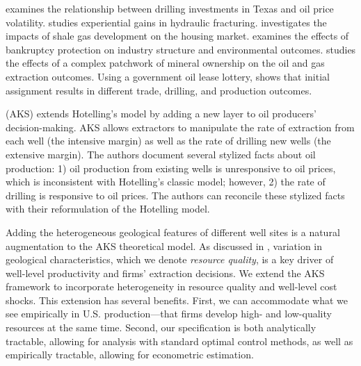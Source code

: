 {\cite{The-Effect-of-Uncertainty-on-Investment-Evidence-from-Texas-Oil-Drilling_Kellogg_2014} examines the relationship between drilling investments in Texas and oil price volatility. \cite{Experiential-Gains-with-a-New-Technology_2015_(Fitzgerald)} studies experiential gains in hydraulic fracturing. \cite{The-Housing-Market-Impacts-of-Shale-Gas-Development_Muehlenbach-Lucija-and-Timmins_2015}  investigates the impacts of shale gas development on the housing market. \cite{Drilling-Like-Theres-No-Tomorrow_Boomhower_2019} examines the effects of bankruptcy protection on industry structure and environmental outcomes. \cite{Patchwork-Policies-Spillovers-and-the-Search-for-Oil-and-Gas_Lewis_2019} studies the effects of a complex patchwork of mineral ownership on the oil and gas extraction outcomes. Using a government oil lease lottery, \cite{Information-Asymmetry-Trade-and-Drilling_Evidence-from-an-Oil-Lease-Lottery_Brehm-and-Lewis_2021} shows that initial assignment results in different trade, drilling, and production outcomes.} 

\cite{Hotelling-under-Pressure_AKS_2018} (AKS) extends Hotelling's model by adding a new layer to oil producers' decision-making. AKS allows extractors to manipulate the rate of extraction from each well (the intensive margin) as well as the rate of drilling new wells (the extensive margin). The authors document several stylized facts about oil production: 1) oil production from existing wells is unresponsive to oil prices, which is inconsistent with Hotelling's classic model; however, 2) the rate of drilling is responsive to oil prices. The authors can reconcile these stylized facts with their reformulation of the Hotelling model. 

Adding the heterogeneous geological features of different well sites is a natural augmentation to the AKS theoretical model. As discussed in \cite{Learning-where-to-drill_Agerton_2020}, variation in geological characteristics, which we denote \textit{resource quality}, is a key driver of well-level productivity and firms' extraction decisions. We extend the AKS framework to incorporate heterogeneity in resource quality and well-level cost shocks. This extension has several benefits. First, we can accommodate what we see empirically in U.S. production---that firms develop high- and low-quality resources at the same time. Second, our specification is both analytically tractable, allowing for analysis with standard optimal control methods, as well as empirically tractable, allowing for econometric estimation. 


